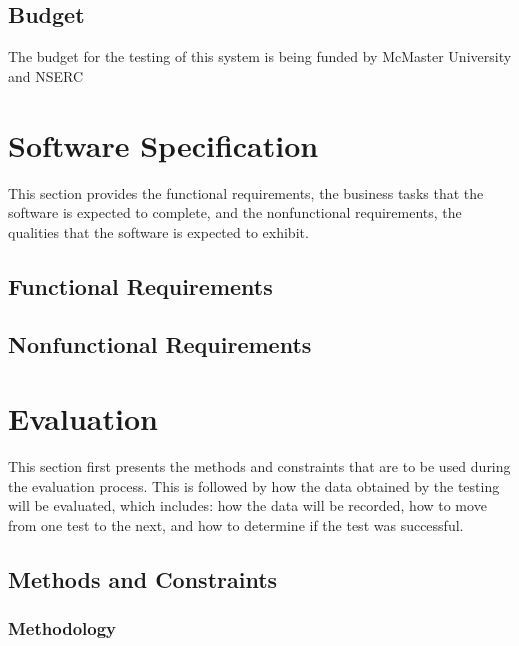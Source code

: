 \documentclass[12pt]{article}
\begin{document}
\subsection{Budget}
The budget for the testing of this system is being funded by McMaster University and NSERC

%
%

\section{Software Specification}
This section provides the functional requirements, the business tasks that the
software is expected to complete, and the nonfunctional requirements, the
qualities that the software is expected to exhibit.

\subsection{Functional Requirements}


\subsection{Nonfunctional Requirements}



%
%

\section{Evaluation}
This section first presents the methods and constraints that are to be used during
the evaluation process. This is followed by how the data obtained by the testing will be 
evaluated, which includes: how the data will be recorded, how to move from one test
to the next, and how to determine if the test was successful. 

\subsection{ Methods and Constraints} 

\subsubsection{Methodology} 
\end{document}
